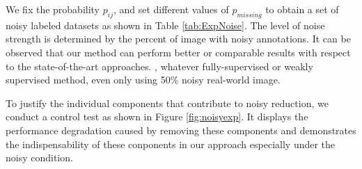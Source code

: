 We fix the probability $p_{ij}$, and set different values of $p_{missing}$ to obtain a set of noisy labeled datasets as shown in Table \ref{tab:ExpNoise}. The level of noise strength is determined by the percent of image with noisy annotations. It can be observed that our method can perform better or comparable results with respect to the state-of-the-art approaches.
\if
, whatever fully-supervised or weakly supervised method, even only using 50\% noisy real-world image.
\fi

To justify the individual components that contribute to noisy reduction, we conduct a control test as shown in Figure \ref{fig:noisyexp}. It displays the performance degradation caused by removing these components and demonstrates the indispensability of these conponents in our approach especially under the noisy condition. 




